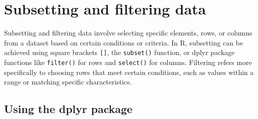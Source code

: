 \documentclass[
]{book}
\newenvironment{Shaded}{\begin{snugshade}}{\end{snugshade}}
\newcommand{\AttributeTok}[1]{\textcolor[rgb]{0.13,0.29,0.53}{#1}}
\newcommand{\CommentTok}[1]{\textcolor[rgb]{0.56,0.35,0.01}{\textit{#1}}}
\newcommand{\DecValTok}[1]{\textcolor[rgb]{0.00,0.00,0.81}{#1}}
\newcommand{\FunctionTok}[1]{\textcolor[rgb]{0.13,0.29,0.53}{\textbf{#1}}}
\newcommand{\NormalTok}[1]{#1}
\newcommand{\OtherTok}[1]{\textcolor[rgb]{0.56,0.35,0.01}{#1}}
\newcommand{\SpecialCharTok}[1]{\textcolor[rgb]{0.81,0.36,0.00}{\textbf{#1}}}
\newcommand{\StringTok}[1]{\textcolor[rgb]{0.31,0.60,0.02}{#1}}
\begin{document}
\section*{Subsetting and filtering data}\label{subsetting-and-filtering-data}

Subsetting and filtering data involve selecting specific elements, rows, or columns from a dataset based on certain conditions or criteria. In R, subsetting can be achieved using square brackets \texttt{{[}{]}}, the \texttt{subset()} function, or dplyr package functions like \texttt{filter()} for rows and \texttt{select()} for columns. Filtering refers more specifically to choosing rows that meet certain conditions, such as values within a range or matching specific characteristics.

\begin{Shaded}
\end{Shaded}

\subsection*{Using the dplyr package}\label{using-the-dplyr-package}
\end{document}
